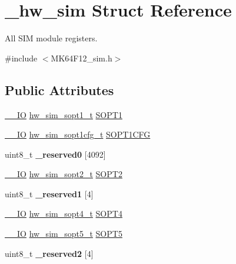 \hypertarget{struct__hw__sim}{}\section{\+\_\+hw\+\_\+sim Struct Reference}
\label{struct__hw__sim}


All S\+IM module registers.  




{\ttfamily \#include $<$M\+K64\+F12\+\_\+sim.\+h$>$}

\subsection*{Public Attributes}
\begin{DoxyCompactItemize}
\item 
\hyperlink{core__sc300_8h_aec43007d9998a0a0e01faede4133d6be}{\+\_\+\+\_\+\+IO} \hyperlink{union__hw__sim__sopt1}{hw\+\_\+sim\+\_\+sopt1\+\_\+t} \hyperlink{struct__hw__sim_a8454ab0e35dbadf532fb430d5c99ab0d}{S\+O\+P\+T1}
\item 
\hyperlink{core__sc300_8h_aec43007d9998a0a0e01faede4133d6be}{\+\_\+\+\_\+\+IO} \hyperlink{union__hw__sim__sopt1cfg}{hw\+\_\+sim\+\_\+sopt1cfg\+\_\+t} \hyperlink{struct__hw__sim_afd7a6126f3c93303400048240cdaa56d}{S\+O\+P\+T1\+C\+FG}
\item 
uint8\+\_\+t {\bfseries \+\_\+reserved0} \mbox{[}4092\mbox{]}\hypertarget{struct__hw__sim_adca189e0ae79d1c351b4c3def4a615db}{}\label{struct__hw__sim_adca189e0ae79d1c351b4c3def4a615db}

\item 
\hyperlink{core__sc300_8h_aec43007d9998a0a0e01faede4133d6be}{\+\_\+\+\_\+\+IO} \hyperlink{union__hw__sim__sopt2}{hw\+\_\+sim\+\_\+sopt2\+\_\+t} \hyperlink{struct__hw__sim_afd7e47c57ddc31b815cf5b3ad2396351}{S\+O\+P\+T2}
\item 
uint8\+\_\+t {\bfseries \+\_\+reserved1} \mbox{[}4\mbox{]}\hypertarget{struct__hw__sim_a50edc6520ccf8d19ed58ea8f9d663280}{}\label{struct__hw__sim_a50edc6520ccf8d19ed58ea8f9d663280}

\item 
\hyperlink{core__sc300_8h_aec43007d9998a0a0e01faede4133d6be}{\+\_\+\+\_\+\+IO} \hyperlink{union__hw__sim__sopt4}{hw\+\_\+sim\+\_\+sopt4\+\_\+t} \hyperlink{struct__hw__sim_a8d2ab8044468a90fd36dbecd77cf8894}{S\+O\+P\+T4}
\item 
\hyperlink{core__sc300_8h_aec43007d9998a0a0e01faede4133d6be}{\+\_\+\+\_\+\+IO} \hyperlink{union__hw__sim__sopt5}{hw\+\_\+sim\+\_\+sopt5\+\_\+t} \hyperlink{struct__hw__sim_ad21131c62f4633683ff6e912dad8a6e5}{S\+O\+P\+T5}
\item 
uint8\+\_\+t {\bfseries \+\_\+reserved2} \mbox{[}4\mbox{]}\hypertarget{struct__hw__sim_acc8435798275777e97f50eb1bcc3a1e6}{}\label{struct__hw__sim_acc8435798275777e97f50eb1bcc3a1e6}


\end{DoxyCompactItemize}
